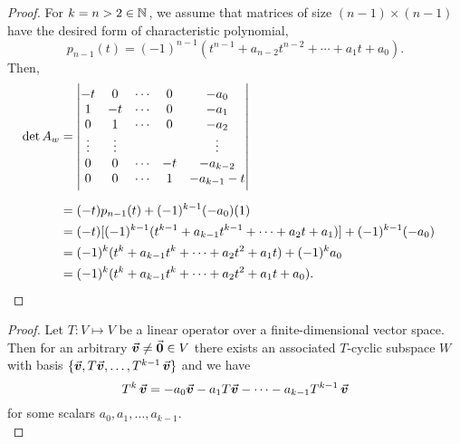 \documentclass[../MathsNotesBase.tex]{subfiles}
\begin{document}
{\begin{proof}
			For ${ k = n > 2 \in \mathbb{N}^{} }$, we assume that matrices of size ${ (n-1) \times (n-1) }$ have the desired form of characteristic polynomial,
			\[ p_{n-1}(t) = (-1)^{n-1} (t^{n-1} + a_{n-2} t^{n-2} + \cdots + a_1 t + a_0). \]
			Then,
			\[\begin{aligned}
				\det A_w &= \begin{vmatrix}
								-t & 0 & \cdots & 0 & -a_0 \\
								1 & -t & \cdots & 0 & -a_1 \\
								0 & 1 & \cdots & 0 & -a_2 \\
								\vdots & \vdots & &  & \vdots \\
								0 & 0 & \cdots & -t & -a_{k-2} \\
								0 & 0 & \cdots & 1 & -a_{k-1} - t \\
							\end{vmatrix} \nn
				&= (-t) p_{n-1}(t) + (-1)^{k-1} (-a_0) (1) &\sidecomment{} \\
				&= (-t) [(-1)^{k-1} (t^{k-1} + a_{k-1} t^{k-1} + \cdots + a_2 t + a_1)] + (-1)^{k-1} (-a_0) &\sidecomment{} \\
				&= (-1)^k (t^k + a_{k-1} t^k + \cdots + a_2 t^2 + a_1 t) + (-1)^k a_0 &\sidecomment{} \\
				&= (-1)^k (t^k + a_{k-1} t^k + \cdots + a_2 t^2 + a_1 t + a_0). \qedhere
			\end{aligned}\]
		\end{proof}
	
	
		\biggerskip
		\begin{proof}
			Let ${ T: V \longmapsto V }$ be a linear operator over a finite-dimensional vector space. Then for an arbitrary ${ \vec{\bm{v}} \neq \vec{\bm{0}} \in V }$ there exists an associated $T$-cyclic subspace $W$ with basis ${ \{ \vec{\bm{v}}, T\vec{\bm{v}}, \dots, T^{k-1}\,\vec{\bm{v}} \} }$ and we have
			\[ T^k\,\vec{\bm{v}} = -a_0\vec{\bm{v}} - a_1 T\vec{\bm{v}} - \cdots - a_{k-1} T^{k-1}\,\vec{\bm{v}} \]
			for some scalars ${ a_0,a_1,\dots,a_{k-1} }$.\\
			

\end{proof}}
\end{document}
